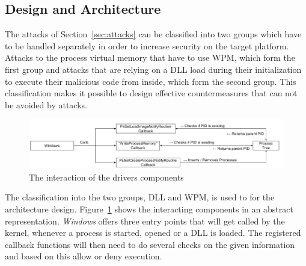 \subsection{Design and Architecture}
The attacks of Section~\ref{sec:attacks} can be classified into two groups which have to be handled separately in order to increase security on the target platform. Attacks to the process virtual memory that have to use \gls{WPM}, which form the first group and attacks that are relying on a \gls{DLL} load during their initialization to execute their malicious code from inside, which form the second group. This classification makes it possible to design effective countermeasures that can not be avoided by attacks.
\begin{figure}[h]
\centering
\includegraphics[angle=90,scale=0.6]{sections/implementation/interaction.png}
\caption{The interaction of the drivers components}
\label{fig:interaction}
\end{figure}
The classification into the two groups, \gls{DLL} and \gls{WPM}, is used to for the architecture design. Figure~\ref{fig:interaction} shows the interacting components in an abstract representation. \emph{Windows} offers three entry points that will get called by the kernel, whenever a process is started, opened or a \gls{DLL} is loaded. The registered callback functions will then need to do several checks on the given information and based on this allow or deny execution.  
